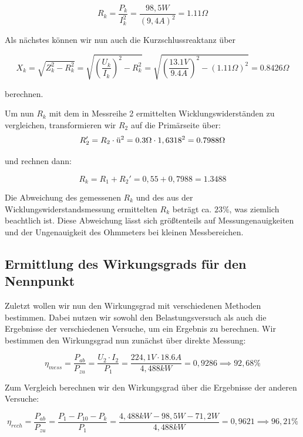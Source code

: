 \documentclass{article}
\begin{document}
\begin{equation*}
  R_{k} = \frac{P_{k}}{I_{k}^{2}} = \frac{98,5W}{(9,4A)^{2}} = 1.11\Omega
\end{equation*}

Als nächstes können wir nun auch die Kurzschlussreaktanz über

\begin{equation*}
  X_{k} = \sqrt{Z_{k}^{2}-R_{k}^{2}} = \sqrt{\left(\frac{U_{k}}{I_{k}}\right)^{2}-R_{k}^{2}} = \sqrt{\left(\frac{13.1V}{9.4A}\right)^{2} - (1.11\Omega)^{2}} = 0.8426\Omega
\end{equation*}

berechnen.

Um nun $R_{k}$ mit dem in Messreihe 2 ermittelten Wicklungswiderständen zu vergleichen, transformieren wir $R_{2}$ auf die Primärseite über:
\[
  R_{2}' = R_{2}\cdot \textnormal{ü}^{2} = 0.3\Omega \cdot 1,6318^{2} = 0.7988\Omega
\]

und rechnen dann:

\[
  R_{k} = R_{1} + R_{2}' = 0,55 + 0,7988 = 1.3488
\]

Die Abweichung des gemessenen $R_{k}$ und des aus der Wicklungswiderstandsmessung ermittelten $R_{k}$ beträgt ca. $23\%$, was ziemlich beachtlich ist. Diese Abweichung lässt sich größtenteils auf Messungenauigkeiten und der Ungenauigkeit des Ohmmeters bei kleinen Messbereichen.


\subsection{Ermittlung des Wirkungsgrads für den Nennpunkt}
\label{sec:ermittl-des-wirk}

Zuletzt wollen wir nun den Wirkungsgrad mit verschiedenen Methoden bestimmen. Dabei nutzen wir sowohl den Belastungsversuch als auch die Ergebnisse der verschiedenen Versuche, um ein Ergebnis zu berechnen. Wir bestimmen den Wirkungsgrad nun zunächst über direkte Messung:

\begin{equation*}
  \eta_{mess} = \frac{P_{ab}}{P_{zu}} = \frac{U_{2} \cdot I_{2}}{P_{1}} = \frac{224,1V \cdot 18.6A}{4,488kW} = 0,9286 \implies 92,68\%
\end{equation*}

Zum Vergleich berechnen wir den Wirkungsgrad über die Ergebnisse der anderen Versuche:

\begin{equation*}
  \eta_{rech} = \frac{P_{ab}}{P_{zu}} = \frac{P_{1} - P_{10} - P_{k}}{P_{1}} = \frac{4,488kW - 98,5W - 71,2W}{4,488kW} = 0,9621 \implies 96,21\%
\end{equation*}
\end{document}
